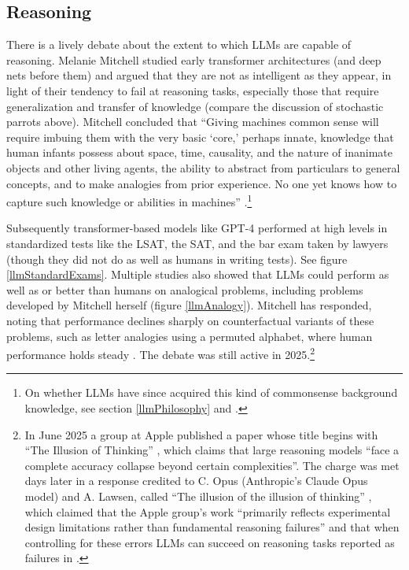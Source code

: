 \subsection{Reasoning}\label{llmReasoning}

There is a lively debate about the extent to which LLMs are capable of
reasoning. Melanie Mitchell studied early transformer architectures (and deep
nets before them) and argued that they are not as intelligent as they appear,
in light of their tendency to fail at reasoning tasks, especially those that
require generalization and transfer of knowledge (compare the discussion of
stochastic parrots above).  Mitchell concluded that ``Giving machines common sense will
require imbuing them with the very basic `core,' perhaps innate, knowledge that
human infants possess about space, time, causality, and the nature of inanimate
objects and other living agents, the ability to abstract from particulars to
general concepts, and to make analogies from prior experience. No one yet knows
how to capture such knowledge or abilities in machines'' \cite{mitchell2021ai}.\footnote{On
whether LLMs have since acquired this kind of commonsense background knowledge,
see section \ref{llmPhilosophy} and \cite{yoshimi2026phenomenology}.}

Subsequently transformer-based models like GPT-4 performed at high
levels in standardized tests like the LSAT, the SAT, and the bar exam taken by lawyers (though they did not
do as well as humans in writing tests). See figure \ref{llmStandardExams}. Multiple studies
also showed that LLMs could perform as well as or better than humans on
analogical problems, including problems developed by Mitchell herself
\cite{webb2023emergent} (figure \ref{llmAnalogy}).  Mitchell has responded, noting that performance
declines sharply on counterfactual variants of these problems, such as letter
analogies using a permuted alphabet, where human performance holds steady
\cite{lewis2025evaluating}. The debate was still active in
2025.\footnote{In June 2025 a group at Apple published a paper whose title begins with ``The
Illusion of Thinking'' \cite{shojaee2025illusion}, which claims that large
reasoning models ``face a complete accuracy collapse beyond
certain complexities''. The charge was met days later in a response credited to C. Opus (Anthropic's Claude Opus model) and A. Lawsen,
called ``The illusion of the illusion of thinking'' \cite{opus2025illusion},
which claimed that the Apple group's work ``primarily reflects experimental
design limitations rather than fundamental reasoning failures'' and that when
controlling for these errors LLMs can succeed on reasoning tasks reported
as failures in \cite{shojaee2025illusion}.}

